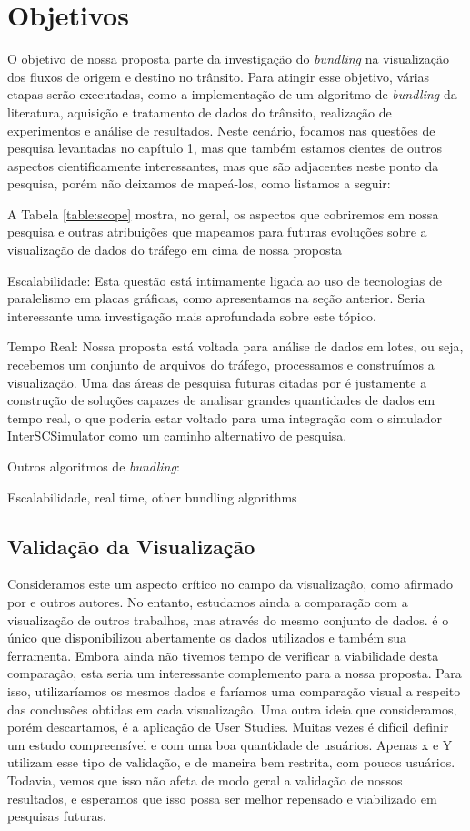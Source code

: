 \section{Objetivos}
  
O objetivo de nossa proposta parte da investigação do \emph{bundling} na visualização
dos fluxos de origem e destino no trânsito. Para atingir esse objetivo, várias
etapas serão executadas, como a implementação de um algoritmo de
\emph{bundling} da literatura, aquisição e tratamento de dados do trânsito,
realização de experimentos e análise de resultados. Neste cenário, focamos
nas questões de pesquisa levantadas no capítulo 1, mas que também estamos
cientes de outros aspectos cientificamente interessantes, mas que são adjacentes
neste ponto da pesquisa,  porém não deixamos de mapeá-los, como listamos a seguir:

A Tabela \ref{table:scope}
mostra, no geral, os aspectos que cobriremos em nossa pesquisa e outras
atribuições que mapeamos para futuras evoluções sobre a visualização de dados
do tráfego em cima de nossa proposta

Escalabilidade: Esta questão está intimamente ligada ao uso de tecnologias de paralelismo
em placas gráficas, como apresentamos na seção anterior. Seria interessante uma
investigação mais aprofundada sobre este tópico.

Tempo Real: Nossa proposta está voltada para análise de dados em lotes, ou seja,
recebemos um conjunto de arquivos do tráfego, processamos e construímos a visualização.
Uma das áreas de pesquisa futuras citadas por \cite{Fulano} é justamente a construção
de soluções capazes de analisar grandes quantidades de dados em tempo real, o que
poderia estar voltado para uma integração com o simulador InterSCSimulator como
um caminho alternativo de pesquisa.

Outros algoritmos de \emph{bundling}: 

Escalabilidade, real time, other bundling algorithms

\subsection{Validação da Visualização}
  Consideramos este um aspecto crítico no campo da visualização, como afirmado
por \citet{Telea2018} e outros autores. No entanto, estudamos ainda a comparação
com a visualização de outros trabalhos, mas através do mesmo conjunto de dados.
\citet{Guo2011} é o único que disponibilizou abertamente os dados utilizados
e também sua ferramenta. Embora ainda não tivemos tempo de verificar a viabilidade
desta comparação, esta seria um interessante complemento para a nossa proposta.
Para isso, utilizaríamos os mesmos dados e faríamos uma comparação visual a respeito
das conclusões obtidas em cada visualização. Uma outra ideia que consideramos, porém
descartamos, é a aplicação de User Studies. Muitas vezes é difícil definir um estudo
compreensível e com uma boa quantidade de usuários. Apenas x e Y utilizam esse tipo
de validação, e de maneira bem restrita, com poucos usuários. Todavia, vemos que
isso não afeta de modo geral a validação de nossos resultados, e esperamos que isso
possa ser melhor repensado e viabilizado em pesquisas futuras.

